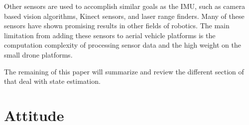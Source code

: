 \documentclass[conference]{IEEEtran}
\begin{document}
Other sensors are used to accomplish similar goals as the IMU, such as camera based vision algorithms, Kinect sensors, and laser range finders. Many of these sensors have shown promising results in other fields of robotics. The main limitation from adding these sensors to aerial vehicle platforms is the computation complexity of processing sensor data and the high weight on the small drone platforms.

The remaining of this paper will summarize and review the different section of \cite{6289431} that deal with state estimation.

\section{Attitude}




\end{document}
